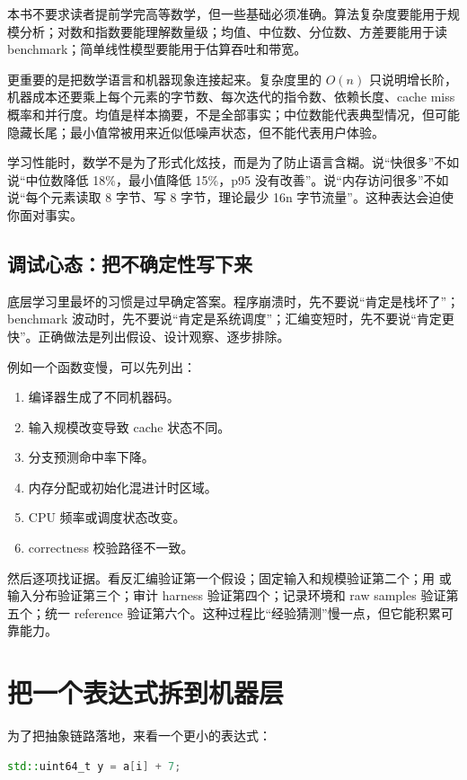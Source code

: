 本书不要求读者提前学完高等数学，但一些基础必须准确。算法复杂度要能用于规模分析；对数和指数要能理解数量级；均值、中位数、分位数、方差要能用于读 benchmark；简单线性模型要能用于估算吞吐和带宽。

更重要的是把数学语言和机器现象连接起来。复杂度里的 $O(n)$ 只说明增长阶，机器成本还要乘上每个元素的字节数、每次迭代的指令数、依赖长度、cache miss 概率和并行度。均值是样本摘要，不是全部事实；中位数能代表典型情况，但可能隐藏长尾；最小值常被用来近似低噪声状态，但不能代表用户体验。

学习性能时，数学不是为了形式化炫技，而是为了防止语言含糊。说“快很多”不如说“中位数降低 18\%，最小值降低 15\%，p95 没有改善”。说“内存访问很多”不如说“每个元素读取 8 字节、写 8 字节，理论最少 16n 字节流量”。这种表达会迫使你面对事实。

\subsection{调试心态：把不确定性写下来}

底层学习里最坏的习惯是过早确定答案。程序崩溃时，先不要说“肯定是栈坏了”；benchmark 波动时，先不要说“肯定是系统调度”；汇编变短时，先不要说“肯定更快”。正确做法是列出假设、设计观察、逐步排除。

例如一个函数变慢，可以先列出：

\begin{enumerate}
  \item 编译器生成了不同机器码。
  \item 输入规模改变导致 cache 状态不同。
  \item 分支预测命中率下降。
  \item 内存分配或初始化混进计时区域。
  \item CPU 频率或调度状态改变。
  \item correctness 校验路径不一致。
\end{enumerate}

然后逐项找证据。看反汇编验证第一个假设；固定输入和规模验证第二个；用  或输入分布验证第三个；审计 harness 验证第四个；记录环境和 raw samples 验证第五个；统一 reference 验证第六个。这种过程比“经验猜测”慢一点，但它能积累可靠能力。

\section{把一个表达式拆到机器层}

为了把抽象链路落地，来看一个更小的表达式：

\begin{lstlisting}[language=C++]
std::uint64_t y = a[i] + 7;
\end{lstlisting}

